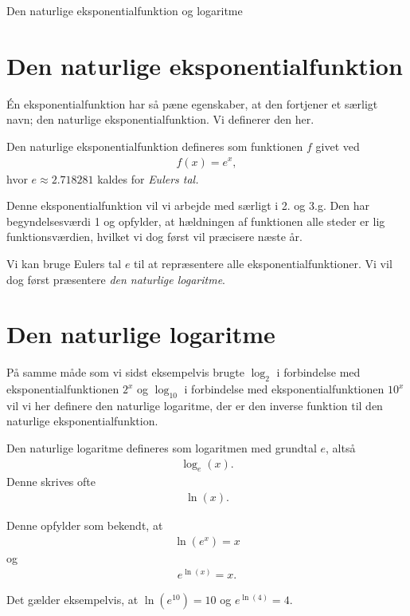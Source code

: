 \begin{center}
\Huge
Den naturlige eksponentialfunktion og logaritme
\end{center}

\section*{Den naturlige eksponentialfunktion}

Én eksponentialfunktion har så pæne egenskaber, at den fortjener et særligt navn; den naturlige eksponentialfunktion. Vi definerer den her.
\begin{defn}
	Den naturlige eksponentialfunktion defineres som funktionen $f$ givet ved
	\begin{align*}
		f(x) = e^x,
	\end{align*}
	hvor $e \approx 2.718281$ kaldes for \textit{Eulers tal.}
\end{defn}
Denne eksponentialfunktion vil vi arbejde med særligt i 2. og 3.g. Den har begyndelsesværdi 1 og opfylder, at hældningen af funktionen alle steder er lig funktionsværdien, hvilket vi dog først vil præcisere næste år. 

Vi kan bruge Eulers tal $e$ til at repræsentere alle eksponentialfunktioner. Vi vil dog først præsentere \textit{den naturlige logaritme}. 

\section*{Den naturlige logaritme}

På samme måde som vi sidst eksempelvis brugte $\log_2$ i forbindelse med eksponentialfunktionen $2^x$ og $\log_{10}$ i forbindelse med eksponentialfunktionen $10^x$ vil vi her definere den naturlige logaritme, der er den inverse funktion til den naturlige eksponentialfunktion. 
\begin{defn}
	Den naturlige logaritme defineres som logaritmen med grundtal $e$, altså
	\begin{align*}
		\log_e(x).
	\end{align*}
	Denne skrives ofte 
	\begin{align*}
		\ln(x).
	\end{align*}
\end{defn}
Denne opfylder som bekendt, at 
\begin{align*}
	\ln(e^x) = x
\end{align*}
og 
\begin{align*}
	e^{\ln(x)} = x.
\end{align*}
\begin{exa}
	Det gælder eksempelvis, at $\ln(e^{10}) = 10$ og $e^{\ln(4)} = 4$.
\end{exa}

